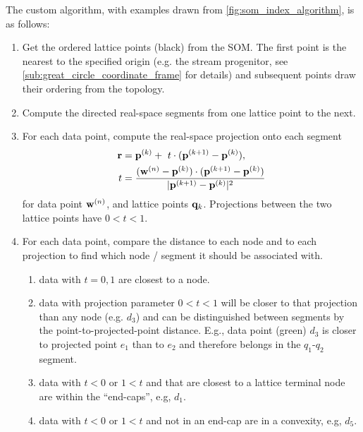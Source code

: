 \documentclass[fleqn,usenatbib]{mnras}
\begin{document}
      The custom algorithm, with examples drawn from
      \autoref{fig:som_index_algorithm}, is as follows:
      \begin{enumerate}[label={(\bfseries \arabic*):}, leftmargin=*]
      \itemsep0.5em
        \item Get the ordered lattice points (black) from the SOM. The first
        point is the nearest to the specified origin (e.g. the stream
        progenitor, see \autoref{sub:great_circle_coordinate_frame} for details)
        and subsequent points draw their ordering from the topology.
        \item Compute the directed real-space segments from one lattice point to
        the next.
        \item For each data point, compute the real-space projection onto each
        segment
            \begin{align}
              \mathbf{r} &= \mathbf{p}^{(k)} + \ t \cdot (\mathbf{p}^{(k+1)} - \mathbf{p}^{(k)}),
              \\
              t &= \frac{(\mathbf{w}^{(n)}-\mathbf{p}^{(k)}) \cdot (\mathbf{p}^{(k+1)}-\mathbf{p}^{(k)})}{|\mathbf{p}^{(k+1)}-\mathbf{p}^{(k)}|^2}
            \end{align}
            for data point $\mathbf{w}^{(n)}$, and lattice points $\mathbf{q}_k$.
            Projections between the two lattice points have $0<t<1$.
        \item For each data point, compare the distance to each node and to each
        projection to find which node / segment it should be associated with.
          \begin{enumerate}[label={(\bfseries \arabic*):}, leftmargin=*]
          \itemsep0.5em
              \item data with $t=0,1$ are closest to a node.
              \item data with projection parameter $0<t<1$ will be closer to
              that projection than any node (e.g. $d_3$) and can be
              distinguished between segments by the point-to-projected-point
              distance. E.g., data point (green) $d_3$ is closer to projected
              point $e_1$ than to $e_2$ and therefore belongs in the $q_1$-$q_2$
              segment.
              \item data with $t < 0$ or $1 < t$ and that are closest to a
              lattice terminal node are within the ``end-caps'', e.g, $d_1$.
              \item data with $t < 0$ or $1 < t$ and not in an end-cap are in a
              convexity, e.g, $d_5$.

\end{enumerate}
\end{enumerate}
\end{document}
